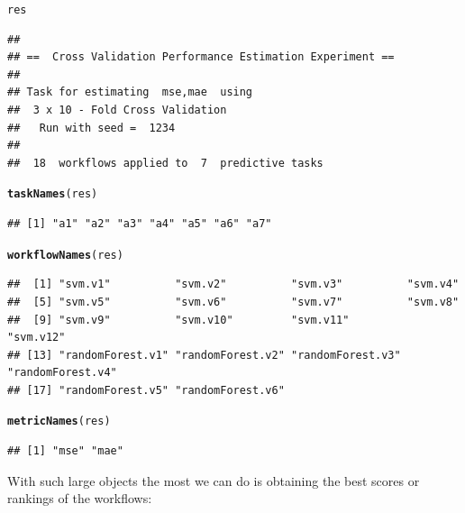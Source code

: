 \documentclass[10pt,a4paper]{article}\usepackage[]{graphicx}\usepackage[]{color}
\makeatletter
\newcommand{\hlstd}[1]{\textcolor[rgb]{0.345,0.345,0.345}{#1}}%
\newcommand{\hlkwd}[1]{\textcolor[rgb]{0.737,0.353,0.396}{\textbf{#1}}}%
\newenvironment{kframe}{%
 \def\at@end@of@kframe{}%
 \ifinner\ifhmode%
  \def\at@end@of@kframe{\end{minipage}}%
  \begin{minipage}{\columnwidth}%
 \fi\fi%
 \def\FrameCommand##1{\hskip\@totalleftmargin \hskip-\fboxsep
 \colorbox{shadecolor}{##1}\hskip-\fboxsep
     \hskip-\linewidth \hskip-\@totalleftmargin \hskip\columnwidth}%
 \MakeFramed {\advance\hsize-\width
   \@totalleftmargin\z@ \linewidth\hsize
   \@setminipage}}%
 {\par\unskip\endMakeFramed%
 \at@end@of@kframe}
\newenvironment{knitrout}{}{} %
\makeatother
\begin{document}
\begin{knitrout}\small
{}\color{fgcolor}\begin{kframe}
\begin{alltt}
\hlstd{res}
\end{alltt}
\begin{verbatim}
## 
## ==  Cross Validation Performance Estimation Experiment ==
## 
## Task for estimating  mse,mae  using
##  3 x 10 - Fold Cross Validation
## 	 Run with seed =  1234 
## 
##  18  workflows applied to  7  predictive tasks
\end{verbatim}
\begin{alltt}
\hlkwd{taskNames}\hlstd{(res)}
\end{alltt}
\begin{verbatim}
## [1] "a1" "a2" "a3" "a4" "a5" "a6" "a7"
\end{verbatim}
\begin{alltt}
\hlkwd{workflowNames}\hlstd{(res)}
\end{alltt}
\begin{verbatim}
##  [1] "svm.v1"          "svm.v2"          "svm.v3"          "svm.v4"         
##  [5] "svm.v5"          "svm.v6"          "svm.v7"          "svm.v8"         
##  [9] "svm.v9"          "svm.v10"         "svm.v11"         "svm.v12"        
## [13] "randomForest.v1" "randomForest.v2" "randomForest.v3" "randomForest.v4"
## [17] "randomForest.v5" "randomForest.v6"
\end{verbatim}
\begin{alltt}
\hlkwd{metricNames}\hlstd{(res)}
\end{alltt}
\begin{verbatim}
## [1] "mse" "mae"
\end{verbatim}
\end{kframe}
\end{knitrout}

With such large objects the most we can do is obtaining the best
scores or rankings of the workflows:
\end{document}
